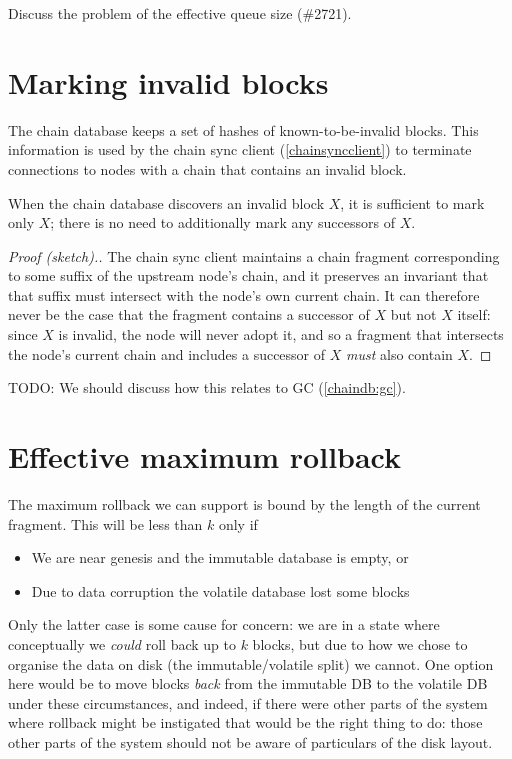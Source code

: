 Discuss the problem of the effective queue size (\#2721).

\section{Marking invalid blocks}
\label{chaindb:invalidblocks}

The chain database keeps a set of hashes of known-to-be-invalid blocks.
This information is used by the chain sync client (\cref{chainsyncclient}) to
terminate connections to nodes with a chain that contains an invalid block.

\begin{lemma}
\label{chaindb:dont-mark-invalid-successors}
When the chain database discovers an invalid block $X$, it is sufficient
to mark only $X$; there is no need to additionally mark any successors of $X$.
\end{lemma}

\begin{proof}[Proof (sketch).]
The chain sync client maintains a chain fragment corresponding to some suffix
of the upstream node's chain, and it preserves an invariant that that suffix
must intersect with the node's own current chain. It can therefore never be
the case that the fragment contains a successor of $X$ but not $X$ itself:
since $X$ is invalid, the node will never adopt it, and so a fragment that
intersects the node's current chain and includes a successor of $X$ \emph{must}
also contain $X$.
\end{proof}

TODO: We should discuss how this relates to GC (\cref{chaindb:gc}).

\section{Effective maximum rollback}

The maximum rollback we can support is bound by the length of the current  fragment. This will be less than $k$ only if

\begin{itemize}
\item We are near genesis and the immutable database is empty, or
\item Due to data corruption the volatile database lost some blocks
\end{itemize}

Only the latter case is some cause for concern: we are in a state where
conceptually we \emph{could} roll back up to $k$ blocks, but due to how we chose
to organise the data on disk (the immutable/volatile split) we cannot. One
option here would be to move blocks \emph{back} from the immutable DB to the
volatile DB under these circumstances, and indeed, if there were other parts of
the system where rollback might be instigated that would be the right thing to
do: those other parts of the system should not be aware of particulars of the
disk layout.

